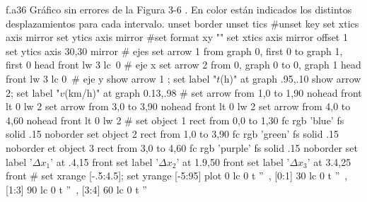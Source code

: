\begin{plot}{.9}{f.a36}
    {Gráfico sin errores de la Figura 3-6 \parencite[65]{alvarenga}. En color
  están indicados los distintos desplazamientos para cada intervalo.}
  unset border
  unset tics
  #unset key
  set xtics axis mirror
  set ytics axis mirror
  #set format xy ""
  set xtics axis mirror offset 1
  set ytics axis 30,30 mirror 
  # ejes
  set arrow 1 from graph 0, first 0 to graph 1, first 0 head front lw 3 lc\
  0 # eje x
  set arrow 2 from 0, graph 0 to 0, graph 1 head front lw 3 lc 0\
  # eje y 
  show arrow 1 ; set label "$t$(h)" at graph .95,.10
  show arrow 2; set label "$v$(km/h)" at graph 0.13,.98 
  #
  set arrow from 1,0 to 1,90 nohead front lt 0 lw 2
  set arrow from 3,0 to 3,90 nohead front lt 0 lw 2
  set arrow from 4,0 to 4,60 nohead front lt 0 lw 2
  #
  set object 1 rect from 0,0 to 1,30 fc rgb 'blue' fs solid .15 noborder
  set object 2 rect from 1,0 to 3,90 fc rgb 'green' fs solid .15 noborder
  et object 3 rect from 3,0 to 4,60 fc rgb 'purple' fs solid .15 noborder
  set label '$\Delta x_1$' at .4,15 front
  set label '$\Delta x_2$' at 1.9,50 front
  set label '$\Delta x_3$' at 3.4,25 front
  #
  set xrange [-.5:4.5]; set yrange [-5:95]
  plot 0 lc 0 t ''\
  , [0:1] 30 lc 0 t ''\
  , [1:3] 90 lc 0 t ''\
  , [3:4] 60 lc 0 t ''
\end{plot}
